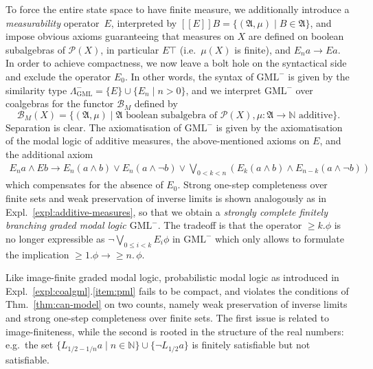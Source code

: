 \documentclass[proceedings]{stacs}
\theoremstyle{definition}
\theoremstyle{plain}
\newcommand{\Pow}{\mathcal{P}}
\newcommand{\Sem}[1]{{[\![#1]\!]}}
\newcommand{\modimpl}{\to}
\newcommand{\Nat}{{\mathbb{N}}}
\newcommand{\Bag}{\mathcal{B}}
\DeclareMathOperator{\mge}{\ge}
\newcommand{\FA}{\mathfrak{A}}
\newcommand{\Lor}{\bigvee}
\begin{document}
\newcommand{\GMLm}{\mathrm{GML}^-}
\begin{exa}\label{expl:gmlm}

  To force the entire state space to have finite measure, we
  additionally introduce a \emph{measurability} operator~$E$,
  interpreted by $\Sem{E}B=\{(\FA,\mu)\mid B\in\FA\}$, and impose
  obvious axioms guaranteeing that measures on $X$ are defined on
  boolean subalgebras of $\Pow(X)$, in particular $E\top$ (i.e.\
  $\mu(X)$ is finite), and $E_na\modimpl Ea$. In order to achieve
  compactness, we now leave a bolt hole on the syntactical side and
  exclude the operator $E_0$. In other words, the syntax of $\GMLm$ is
  given by the similarity type
\( \Lambda_\GMLm = \lbrace E \rbrace \cup \lbrace E_n \mid n > 0
\rbrace \),
and we interpret $\GMLm$ over coalgebras for the functor 
$\Bag_M$ defined by
\[ \Bag_M(X) = \lbrace (\FA, \mu) \mid \FA \mbox{ boolean subalgebra
of $\Pow(X)$}, \mu: \FA \to \Nat \mbox{ additive} \rbrace.
\]
Separation is clear. 
The axiomatisation of $\GMLm$ is given by the axiomatisation of the
modal logic of additive measures, the above-mentioned axioms on $E$,
and the additional axiom 
\begin{gather*}
  E_n a\land E b \modimpl E_n (a\land b) \lor E_n(a\land\neg b) \lor
  \textstyle\Lor_{0<k<n} (E_k(a\land b)\land E_{n-k} (a\land\neg b))
\end{gather*}
which compensates for the absence of $E_0$. Strong one-step
completeness over finite sets and weak preservation of inverse limits
is shown analogously as in Expl.~\ref{expl:additive-measures}, so that
we obtain a \emph{strongly complete finitely branching graded modal
  logic $\GMLm$}. The tradeoff is that the operator $\geq k. \phi$
	is no longer expressible as $\neg \Lor_{0 \leq i < k} E_i
\phi$ in $\GMLm$ which only allows to formulate the implication
$\mge
1.\phi\modimpl\mge n.\,\phi$.
\end{exa}



\begin{exa}
Like image-finite graded modal logic, probabilistic modal logic as
introduced in Expl.~\ref{expl:coalgml}.\ref{item:pml} fails to be
compact, and violates the conditions of Thm.~\ref{thm:can-model} on
two counts, namely weak preservation of inverse limits and strong
one-step completeness over finite sets. The first issue is related to
image-finiteness, while the second is rooted in the structure of the
real numbers: e.g.\ the set $\{L_{1/2-1/n}a\mid n\in\Nat\}\cup\{\neg
L_{1/2}a\}$ is finitely satisfiable but not satisfiable. 
\end{exa}
\end{document}
